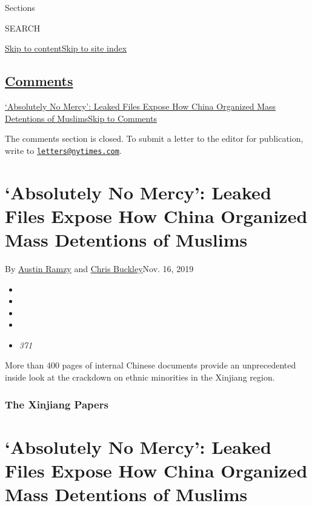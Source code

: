 Sections

SEARCH

\protect\hyperlink{site-content}{Skip to
content}\protect\hyperlink{site-index}{Skip to site index}

\hypertarget{comments}{%
\subsection{\texorpdfstring{\protect\hyperlink{commentsContainer}{Comments}}{Comments}}\label{comments}}

\href{}{`Absolutely No Mercy': Leaked Files Expose How China Organized
Mass Detentions of Muslims}\href{}{Skip to Comments}

The comments section is closed. To submit a letter to the editor for
publication, write to
\href{mailto:letters@nytimes.com}{\nolinkurl{letters@nytimes.com}}.

\hypertarget{absolutely-no-mercy-leaked-files-expose-how-china-organized-mass-detentions-of-muslims}{%
\section{`Absolutely No Mercy': Leaked Files Expose How China Organized
Mass Detentions of
Muslims}\label{absolutely-no-mercy-leaked-files-expose-how-china-organized-mass-detentions-of-muslims}}

By \href{https://www.nytimes.com/by/austin-ramzy}{Austin Ramzy} and
\href{https://www.nytimes.com/by/chris-buckley}{Chris Buckley}Nov. 16,
2019

\begin{itemize}
\item
\item
\item
\item
\item
  \emph{371}
\end{itemize}

More than 400 pages of internal Chinese documents provide an
unprecedented inside look at the crackdown on ethnic minorities in the
Xinjiang region.

\hypertarget{the-xinjiang-papers}{%
\subsubsection{The Xinjiang Papers}\label{the-xinjiang-papers}}

\hypertarget{absolutely-no-mercy-leaked-files-expose-how-china-organized-mass-detentions-of-muslims-1}{%
\section{`Absolutely No Mercy': Leaked Files Expose How China Organized
Mass Detentions of
Muslims}\label{absolutely-no-mercy-leaked-files-expose-how-china-organized-mass-detentions-of-muslims-1}}

